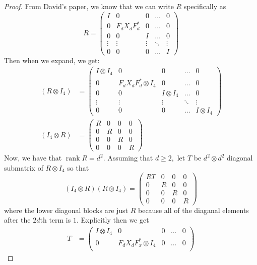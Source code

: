\documentclass{article}
\begin{document}
\begin{enumerate}
\begin{proof}
        From David's paper, we know that we can write $R$ specifically as \[R = \begin{pmatrix}
          I & 0 & 0 & \dots & 0\\
          0 & F_dX_dF_d^* & 0 & \dots & 0\\
          0 & 0 & I & \dots & 0\\
          \vdots & \vdots &\vdots & \ddots & \vdots\\
          0 & 0 & 0 & \dots & I
        \end{pmatrix}\]
        Then when we expand, we get:
        \begin{align*}
          (R\otimes I_4) &= \begin{pmatrix} 
            I\otimes I_4 & 0 & 0 & \dots & 0\\
            0 & F_dX_dF_d^*\otimes I_4 & 0 &\dots & 0\\
            0 & 0 & I\otimes I_4 & \dots & 0\\
            \vdots & \vdots &\vdots &\ddots & \vdots\\
            0 & 0 & 0 & \dots & I\otimes I_4
          \end{pmatrix}\\
          (I_4\otimes R) &= \begin{pmatrix}
            R & 0 & 0 & 0\\0 & R & 0 & 0\\
            0 & 0 & R & 0\\0 & 0 &0  &R
          \end{pmatrix}
        \end{align*}
        Now, we have that $\operatorname*{rank}R = d^2$. Assuming that $d\ge2,$ let $T$ be $d^2\otimes d^2$ diagonal submatrix of $R\otimes I_4$ so that \[(I_4\otimes R)(R\otimes I_4) = \begin{pmatrix}
          RT & 0 & 0 & 0\\
          0 & R & 0 & 0\\
          0 & 0 & R & 0\\
          0 & 0 & 0 & R
        \end{pmatrix}\]
        where the lower diagonal blocks are just $R$ because all of the diaganal elements after the $2d$th term is $1.$ Explicitly then we get
        \begin{align*}
          T &= \begin{pmatrix}
            I\otimes I_4 & 0 & 0 & \dots & 0\\
            0 & F_dX_dF_x^*\otimes I_4 & 0 &\dots & 0\\

\end{pmatrix}
\end{align*}
\end{proof}
\end{enumerate}
\end{document}
